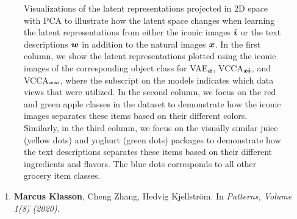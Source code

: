 \begin{figure}[t]
	\centering
	
	\caption{ \small{Visualizations of the latent representations projected in 2D space with PCA to illustrate how the latent space changes when learning the latent representations from either the iconic images ${\bm{i}}$ or the text descriptions ${\bm{w}}$ in addition to the natural images ${\bm{x}}$. In the first column, we show the latent representations plotted using the iconic images of the corresponding object class for VAE$_{\bm{x}}$, VCCA$_{{\bm{x}}{\bm{i}}}$, and VCCA$_{{\bm{x}}{\bm{w}}}$, where the subscript on the models indicates which data views that were utilized. In the second column, we focus on the red and green apple classes in the dataset to demonstrate how the iconic images separates these items based on their different colors. Similarly, in the third column, we focus on the visually similar juice (yellow dots) and yoghurt (green dots) packages to demonstrate how the text descriptions separates these items based on their different ingredients and flavors. The blue dots corresponds to all other grocery item classes. } }
	\label{fig:paperB_pca_latents}
\end{figure}



\begin{enumerate}
	\item[] \textbf{Marcus Klasson}, Cheng Zhang, Hedvig Kjellström. In \textit{Patterns, Volume 1(8) (2020)}.
\end{enumerate}

